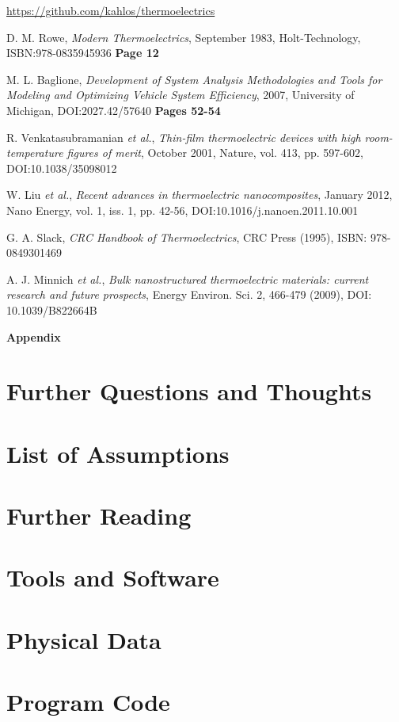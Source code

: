 \documentclass[12pt,draft]{article}
\begin{document}
\url{https://github.com/kahlos/thermoelectrics}

\begin{thebibliography}{11}

D. M. Rowe,
\emph{Modern Thermoelectrics},
September 1983,
Holt-Technology,
ISBN:978-0835945936
\textbf{Page 12}

M. L. Baglione,
\emph{Development of System Analysis Methodologies and Tools for Modeling and Optimizing Vehicle System Efficiency},
2007,
University of Michigan,
DOI:2027.42/57640
\textbf{Pages 52-54}

R. Venkatasubramanian \emph{et al.},
\emph{Thin-film thermoelectric devices with high room-temperature figures of merit},
October 2001,
Nature, vol. 413, pp. 597-602,
DOI:10.1038/35098012

W. Liu \emph{et al.},
\emph{Recent advances in thermoelectric nanocomposites},
January 2012,
Nano Energy, vol. 1, iss. 1, pp. 42-56,
DOI:10.1016/j.nanoen.2011.10.001

G. A. Slack,
\emph{CRC Handbook of Thermoelectrics},
CRC Press (1995),
ISBN: 978-0849301469

A. J. Minnich \emph{et al.}, \emph{Bulk nanostructured thermoelectric materials: current research and future prospects}, Energy Environ. Sci. 2, 466-479 (2009), DOI: 10.1039/B822664B
\end{thebibliography}


\appendix

\huge\textbf{Appendix}

\section{Further Questions and Thoughts}



\section{List of Assumptions}

\section{Further Reading}

\section{Tools and Software}

\section{Physical Data}

\section{Program Code}
\end{document}
